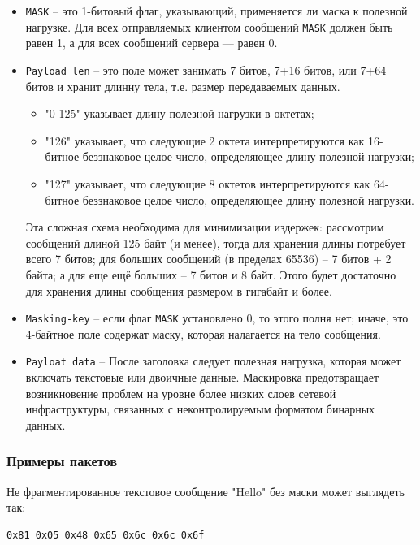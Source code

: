 \begin{itemize}
\begin{itemize}
\end{itemize}
\item \texttt{MASK} -- это 1-битовый флаг, указывающий, применяется ли маска к полезной нагрузке. Для всех отправляемых клиентом сообщений \texttt{MASK} должен быть равен 1, а для всех сообщений сервера — равен 0.
\item \texttt{Payload len} -- это поле может занимать 7 битов, 7+16 битов, или 7+64 битов и хранит длинну тела, т.е. размер передаваемых данных.
\begin{itemize}
    \item "0-125" указывает длину полезной нагрузки в октетах;
    \item "126" указывает, что следующие 2 октета интерпретируются как 16-битное беззнаковое целое число, определяющее длину полезной нагрузки;
    \item "127" указывает, что следующие 8 октетов интерпретируются как 64-битное беззнаковое целое число, определяющее длину полезной нагрузки.
\end{itemize}
Эта сложная схема необходима для минимизации издержек: рассмотрим сообщений длиной 125 байт (и менее), тогда для хранения длины потребует всего 7 битов; для больших сообщений (в пределах 65536) -- 7 битов + 2 байта; а для еще ещё больших -- 7 битов и 8 байт. Этого будет достаточно для хранения длины сообщения размером в гигабайт и более.
\item \texttt{Masking-key} -- если флаг \texttt{MASK} установлено 0, то этого полня нет; иначе, это 4-байтное поле содержат маску, которая налагается на тело сообщения.
\item \texttt{Payloat data} -- После заголовка следует полезная нагрузка, которая может включать текстовые или двоичные данные. Маскировка предотвращает возникновение проблем на уровне более низких слоев сетевой инфраструктуры, связанных с неконтролируемым форматом бинарных данных.
\end{itemize}

\subsubsection{Примеры пакетов}

Не фрагментированное текстовое сообщение "Hello" без маски может выглядеть так:

\begin{lstlisting}[style=CommandLineStyle]
0x81 0x05 0x48 0x65 0x6c 0x6c 0x6f
\end{lstlisting}

